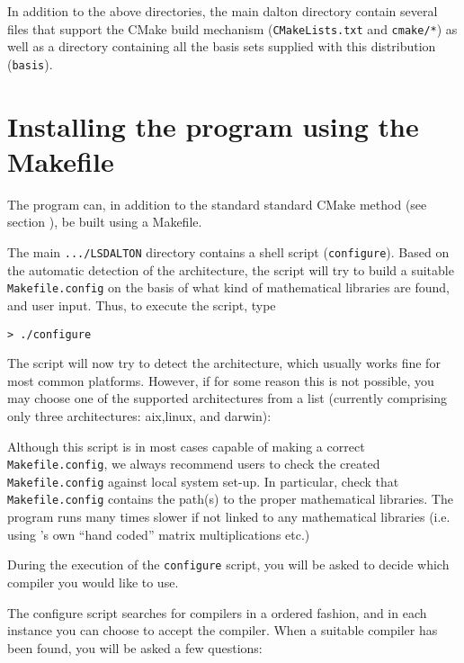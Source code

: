 In addition to the above directories, the main dalton directory contain several
files that support the CMake build mechanism (\verb|CMakeLists.txt| and \verb|cmake/*|) as well as 
a directory containing all the basis sets supplied with this distribution (\verb|basis|).

\section{Installing the program using the Makefile}\label{sec:Makefile}

The {\lsdalton} program can, in addition to the standard 
standard CMake method (see section \cite{installation instructions}), be 
built using a Makefile.

The main \verb|.../LSDALTON| directory contains a shell script (\verb|configure|).
Based on the automatic detection of the architecture, the
script will try to build a suitable
\verb|Makefile.config| on the
basis of what kind of mathematical libraries are found, and user
input. Thus, to execute the script, type
\begin{verbatim}
> ./configure 
\end{verbatim}

The script will now try to detect the architecture, which usually works fine
for most common platforms. However, if for some reason this is not possible, you
may choose one of the supported architectures from a list (currently comprising
only three architectures: aix,linux, and darwin):

Although this script is in most cases capable of making a correct
\verb|Makefile.config|, we always recommend users to check the created
\verb|Makefile.config| against local system set-up. 
In particular, check that \verb|Makefile.config| contains the path(s)
to the proper mathematical libraries. The program runs many times slower
if not linked to any mathematical libraries (i.e. using {\lsdalton}'s own 
``hand coded'' matrix multiplications etc.)

During the execution of the \verb|configure| script, you will be
asked to decide which compiler you would like to use. 

The configure script searches for compilers in a ordered fashion, and in 
each instance you can choose to accept the compiler. When a suitable compiler has been found, you will be asked a few questions:

